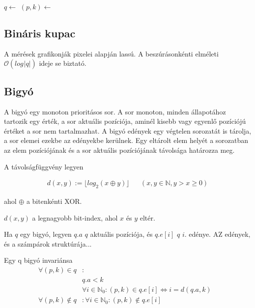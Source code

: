 \begin{algorithmic}[1]
\State $q \gets$ 
		\State $(p, k) \gets $ 
		\State {}
		\State {}
	\EndWhile
		\State {}
	\EndIf
\EndFor
\end{algorithmic}

\subsection{Bináris kupac}

A mérések grafikonják pixelei alapján lassú. A beszúrásonkénti elméleti
$\mathcal{O}(log_{}{|q|})$ ideje se biztató.

\subsection{Bigyó} %

A bigyó egy monoton prioritásos sor.
A sor monoton, minden állapotához tartozik egy érték, a sor aktuális pozíciója,
aminél kisebb vagy egyenlő pozíciójú értéket a sor nem tartalmazhat.
A bigyó edények egy végtelen sorozatát is tárolja, a sor elemei ezekbe az edényekbe kerülnek.
Egy eltárolt elem helyét a sorozatban az elem pozíciójának
és a sor aktuális pozíciójának távolsága határozza meg.

A távolságfüggvény legyen

\begin{align*}
d(x, y) := \lfloor log_{2}{}(x \oplus y) \rfloor & & (x, y \in \mathbb{N}, y > x \ge 0)
\end{align*}

ahol $\oplus$ a bitenkénti XOR.

$d(x, y)$ a legnagyobb bit-index, ahol $x$ és $y$ eltér.

Ha $q$ egy bigyó, legyen $q.a$ $q$ aktuális pozíciója, és $q.e[i]$ $q$ $i$. edénye. AZ edények, és a számpárok struktúrája...

Egy q bigyó invariánsa
\begin{align*}
\forall (p, k) \in q &: &\\ 
	& q.a < k\\
	& \forall i \in \mathbb{N}_{0}: (p, k) \in q.e[i] \iff i=d(q.a, k) \\
\forall (p, k) \not\in q &: \forall i \in \mathbb{N}_{0}: (p, k) \not\in q.e[i]
\end{align*}

